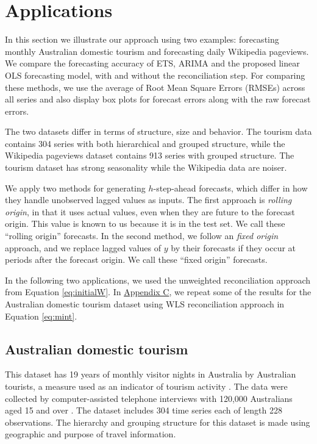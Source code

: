 \documentclass[11pt,a4paper,]{article}
\begin{document}
\hypertarget{applications}{%
\section{Applications}\label{applications}}

In this section we illustrate our approach using two examples:
forecasting monthly Australian domestic tourism and forecasting daily
Wikipedia pageviews. We compare the forecasting accuracy of ETS, ARIMA
and the proposed linear OLS forecasting model, with and without the
reconciliation step. For comparing these methods, we use the average of
Root Mean Square Errors (RMSEs) across all series and also display box
plots for forecast errors along with the raw forecast errors.

The two datasets differ in terms of structure, size and behavior. The
tourism data contains 304 series with both hierarchical and grouped
structure, while the Wikipedia pageviews dataset contains 913 series
with grouped structure. The tourism dataset has strong seasonality while
the Wikipedia data are noiser.

We apply two methods for generating \(h\)-step-ahead forecasts, which
differ in how they handle unobserved lagged values as inputs. The first
approach is \emph{rolling origin}, in that it uses actual values, even
when they are future to the forecast origin. This value is known to us
because it is in the test set. We call these ``rolling origin''
forecasts. In the second method, we follow an \emph{fixed origin}
approach, and we replace lagged values of \(y\) by their forecasts if
they occur at periods after the forecast origin. We call these ``fixed
origin'' forecasts.

In the following two applications, we used the unweighted reconciliation
approach from Equation \eqref{eq:initialW}. In
\protect\hyperlink{appendixC}{Appendix C}, we repeat some of the results
for the Australian domestic tourism dataset using WLS reconciliation
approach in Equation \eqref{eq:mint}.

\hypertarget{australian-domestic-tourism}{%
\subsection{Australian domestic
tourism}\label{australian-domestic-tourism}}

This dataset has 19 years of monthly visitor nights in Australia by
Australian tourists, a measure used as an indicator of tourism activity
\autocite{mint2018}. The data were collected by computer-assisted
telephone interviews with 120,000 Australians aged 15 and over
\autocite{researchAustralia2005}. The dataset includes 304 time series
each of length 228 observations. The hierarchy and grouping structure
for this dataset is made using geographic and purpose of travel
information.
\end{document}

